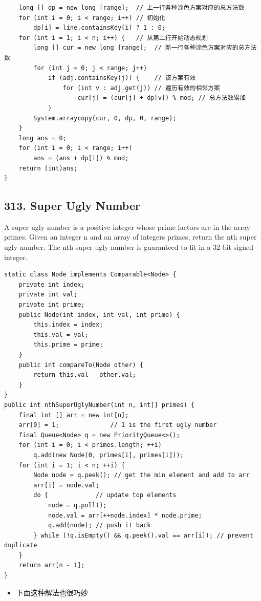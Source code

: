 \documentclass[9pt, b5paaper]{book}
\begin{document}
\begin{verbatim}
    long [] dp = new long [range];  // 上一行各种涂色方案对应的总方法数
    for (int i = 0; i < range; i++) // 初始化
        dp[i] = line.containsKey(i) ? 1 : 0;
    for (int i = 1; i < n; i++) {   // 从第二行开始动态规划
        long [] cur = new long [range];  // 新一行各种涂色方案对应的总方法数
        for (int j = 0; j < range; j++) 
            if (adj.containsKey(j)) {    // 该方案有效
                for (int v : adj.get(j)) // 遍历有效的相邻方案
                    cur[j] = (cur[j] + dp[v]) % mod; // 总方法数累加
            }
        System.arraycopy(cur, 0, dp, 0, range);
    }
    long ans = 0;
    for (int i = 0; i < range; i++) 
        ans = (ans + dp[i]) % mod;
    return (int)ans;
}
\end{verbatim}

\subsection{313. Super Ugly Number}
\label{sec-1-4-25}
A super ugly number is a positive integer whose prime factors are in the array primes.
Given an integer n and an array of integers primes, return the nth super ugly number.
The nth super ugly number is guaranteed to fit in a 32-bit signed integer.
\begin{verbatim}
static class Node implements Comparable<Node> {
    private int index;
    private int val;
    private int prime;
    public Node(int index, int val, int prime) {
        this.index = index;
        this.val = val;
        this.prime = prime;
    }
    public int compareTo(Node other) {
        return this.val - other.val;
    }
}
public int nthSuperUglyNumber(int n, int[] primes) {
    final int [] arr = new int[n];
    arr[0] = 1;              // 1 is the first ugly number
    final Queue<Node> q = new PriorityQueue<>();
    for (int i = 0; i < primes.length; ++i) 
        q.add(new Node(0, primes[i], primes[i]));
    for (int i = 1; i < n; ++i) {
        Node node = q.peek(); // get the min element and add to arr
        arr[i] = node.val;
        do {             // update top elements
            node = q.poll();
            node.val = arr[++node.index] * node.prime;
            q.add(node); // push it back
        } while (!q.isEmpty() && q.peek().val == arr[i]); // prevent duplicate
    }
    return arr[n - 1];
}
\end{verbatim}
\begin{itemize}
\item 下面这种解法也很巧妙
\end{itemize}
\end{document}

